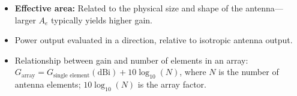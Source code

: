 \documentclass[10pt,landscape]{article}
\makeatletter
\newcommand{\subsubsubsection}{\@startsection{subsubsection}{3}{0mm}%
                                {-1ex plus -.5ex minus -.2ex}%
                                {1ex plus .2ex}%
                                {\normalfont\scriptsize\bfseries}}
\newcommand{\1}{\mathmybb{1}}
\makeatother
\begin{document}
\begin{multicols*}{3}
\begin{itemize}
  \item \textbf{Effective area:} Related to the physical size and shape of the antenna—larger $A_e$ typically yields higher gain.
  \item Power output evaluated in a direction, relative to isotropic antenna output.
  \item Relationship between gain and number of elements in an array: $G_{\text{array}} = G_{\text{single element}}(\text{dBi}) + 10 \log_{10}(N)$, where $N$ is the number of antenna elements; $10 \log_{10}(N)$ is the array factor.
\end{itemize}





\end{multicols*}
\end{document}
